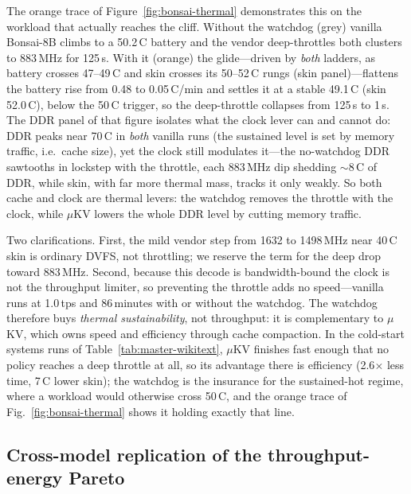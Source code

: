 \documentclass[sigconf, anonymous=false, screen=true]{acmart}
\begin{document}
The orange trace of Figure~\ref{fig:bonsai-thermal} demonstrates this on the workload that actually reaches the cliff. Without the watchdog (grey) vanilla Bonsai-8B climbs to a 50.2\,\textdegree C battery and the vendor deep-throttles both clusters to 883\,MHz for 125\,s. With it (orange) the glide---driven by \emph{both} ladders, as battery crosses 47--49\,\textdegree C and skin crosses its 50--52\,\textdegree C rungs (skin panel)---flattens the battery rise from 0.48 to 0.05\,\textdegree C/min and settles it at a stable 49.1\,\textdegree C (skin 52.0\,\textdegree C), below the 50\,\textdegree C trigger, so the deep-throttle collapses from 125\,s to 1\,s. The DDR panel of that figure isolates what the clock lever can and cannot do: DDR peaks near 70\,\textdegree C in \emph{both} vanilla runs (the sustained level is set by memory traffic, i.e.\ cache size), yet the clock still modulates it---the no-watchdog DDR sawtooths in lockstep with the throttle, each 883\,MHz dip shedding ${\sim}8$\,\textdegree C of DDR, while skin, with far more thermal mass, tracks it only weakly. So both cache and clock are thermal levers: the watchdog removes the throttle with the clock, while $\mu$KV lowers the whole DDR level by cutting memory traffic.

Two clarifications. First, the mild vendor step from 1632 to 1498\,MHz near 40\,\textdegree C skin is ordinary DVFS, not throttling; we reserve the term for the deep drop toward 883\,MHz. Second, because this decode is bandwidth-bound the clock is not the throughput limiter, so preventing the throttle adds no speed---vanilla runs at 1.0\,tps and 86\,minutes with or without the watchdog. The watchdog therefore buys \emph{thermal sustainability}, not throughput: it is complementary to $\mu$KV, which owns speed and efficiency through cache compaction. In the cold-start systems runs of Table~\ref{tab:master-wikitext}, $\mu$KV finishes fast enough that no policy reaches a deep throttle at all, so its advantage there is efficiency (2.6$\times$ less time, 7\,\textdegree C lower skin); the watchdog is the insurance for the sustained-hot regime, where a workload would otherwise cross 50\,\textdegree C, and the orange trace of Fig.~\ref{fig:bonsai-thermal} shows it holding exactly that line.


\subsection{Cross-model replication of the throughput-energy Pareto}
\label{sec:eval-cross}
\end{document}
